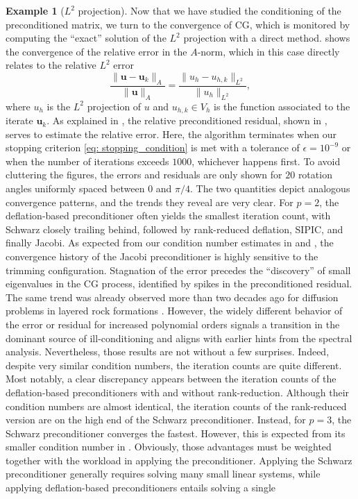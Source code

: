 \documentclass{article}
\numberwithin{equation}{section}
\theoremstyle{definition}
\newtheorem{example}[definition]{Example}
\begin{document}
\begin{example}[$L^2$ projection]
Now that we have studied the conditioning of the preconditioned matrix, we turn to the convergence of CG, which is monitored by computing the ``exact'' solution of the $L^2$ projection with a direct method.  shows the convergence of the relative error in the $A$-norm, which in this case directly relates to the relative $L^2$ error
\begin{equation*}
    \frac{\|\bm{u}-\bm{u}_k\|_A}{\|\bm{u}\|_A} = \frac{\|u_h-u_{h,k}\|_{L^2}}{\|u_h\|_{L^2}},
\end{equation*}
where $u_h$ is the $L^2$ projection of $u$ and $u_{h,k} \in V_h$ is the function associated to the iterate $\bm{u}_k$. As explained in , the relative preconditioned residual, shown in , serves to estimate the relative error. Here, the algorithm terminates when our stopping criterion \eqref{eq: stopping_condition} is met with a tolerance of $\epsilon=10^{-9}$ or when the number of iterations exceeds $1000$, whichever happens first. To avoid cluttering the figures, the errors and residuals are only shown for $20$ rotation angles uniformly spaced between $0$ and $\pi/4$. The two quantities depict analogous convergence patterns, and the trends they reveal are very clear. For $p=2$, the deflation-based preconditioner often yields the smallest iteration count, with Schwarz closely trailing behind, followed by rank-reduced deflation, SIPIC, and finally Jacobi. As expected from our condition number estimates in  and , the convergence history of the Jacobi preconditioner is highly sensitive to the trimming configuration. Stagnation of the error precedes the ``discovery'' of small eigenvalues in the CG process, identified by spikes in the preconditioned residual. The same trend was already observed more than two decades ago for diffusion problems in layered rock formations \cite{vuik1999efficient,vermolen2004deflation}. However, the widely different behavior of the error or residual for increased polynomial orders signals a transition in the dominant source of ill-conditioning and aligns with earlier hints from the spectral analysis. Nevertheless, those results are not without a few surprises. Indeed, despite very similar condition numbers, the iteration counts are quite different. Most notably, a clear discrepancy appears between the iteration counts of the deflation-based preconditioners with and without rank-reduction. Although their condition numbers are almost identical, the iteration counts of the rank-reduced version are on the high end of the Schwarz preconditioner. Instead, for $p=3$, the Schwarz preconditioner converges the fastest. However, this is expected from its smaller condition number in . Obviously, those advantages must be weighted together with the workload in applying the preconditioner. Applying the Schwarz preconditioner generally requires solving many small linear systems, while applying deflation-based preconditioners entails solving a single 
\end{example}
\end{document}
